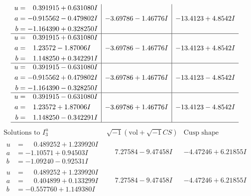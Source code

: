 \documentclass[1p]{elsarticle_modified}
\theoremstyle{definition}
\newcommand{\I}{\sqrt{-1}}
\begin{document}
$$\begin{array}{c|c|c}
\begin{aligned}
u &= \phantom{-}0.391915 + 0.631080 I \\
a &= -0.915562 - 0.479802 I \\
b &= -1.164390 + 0.328250 I\end{aligned}
 & -3.69786 - 1.46776 I & -13.4123 + 4.8542 I \\ \hline\begin{aligned}
u &= \phantom{-}0.391915 + 0.631080 I \\
a &= \phantom{-}1.23572 - 1.87006 I \\
b &= \phantom{-}1.148250 + 0.342291 I\end{aligned}
 & -3.69786 - 1.46776 I & -13.4123 + 4.8542 I \\ \hline\begin{aligned}
u &= \phantom{-}0.391915 - 0.631080 I \\
a &= -0.915562 + 0.479802 I \\
b &= -1.164390 - 0.328250 I\end{aligned}
 & -3.69786 + 1.46776 I & -13.4123 - 4.8542 I \\ \hline\begin{aligned}
u &= \phantom{-}0.391915 - 0.631080 I \\
a &= \phantom{-}1.23572 + 1.87006 I \\
b &= \phantom{-}1.148250 - 0.342291 I\end{aligned}
 & -3.69786 + 1.46776 I & -13.4123 - 4.8542 I\\
 \hline 
 \end{array}$$\newpage$$\begin{array}{c|c|c}  
\text{Solutions to }I^u_{3}& \I (\text{vol} + \sqrt{-1}CS) & \text{Cusp shape}\\
 \hline 
\begin{aligned}
u &= \phantom{-}0.489252 + 1.239920 I \\
a &= -1.10571 + 0.94503 I \\
b &= -1.09240 - 0.92531 I\end{aligned}
 & \phantom{-}7.27584 - 9.47458 I & -4.47246 + 6.21855 I \\ \hline\begin{aligned}
u &= \phantom{-}0.489252 + 1.239920 I \\
a &= \phantom{-}0.404899 + 0.133299 I \\
b &= -0.557760 + 1.149380 I\end{aligned}
 & \phantom{-}7.27584 - 9.47458 I & -4.47246 + 6.21855 I \\ \hline\begin{aligned}

\end{aligned}
\end{array}$$
\end{document}
